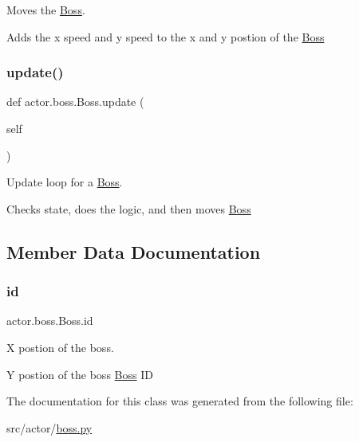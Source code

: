 Moves the \hyperlink{classactor_1_1boss_1_1_boss}{Boss}. 

Adds the x speed and y speed to the x and y postion of the \hyperlink{classactor_1_1boss_1_1_boss}{Boss} \mbox{\label{classactor_1_1boss_1_1_boss_a0caeabbf20958679e55952559a2b74ee}} 
\subsubsection{\texorpdfstring{update()}{update()}}
{\footnotesize\ttfamily def actor.\+boss.\+Boss.\+update (\begin{DoxyParamCaption}\item[{}]{self }\end{DoxyParamCaption})}



Update loop for a \hyperlink{classactor_1_1boss_1_1_boss}{Boss}. 

Checks state, does the logic, and then moves \hyperlink{classactor_1_1boss_1_1_boss}{Boss} 

\subsection{Member Data Documentation}
\mbox{\label{classactor_1_1boss_1_1_boss_a88b3aa7689b1d755e49e5dfbf7f30e86}} 
\subsubsection{\texorpdfstring{id}{id}}
{\footnotesize\ttfamily actor.\+boss.\+Boss.\+id}



X postion of the boss. 

Y postion of the boss \hyperlink{classactor_1_1boss_1_1_boss}{Boss} ID 

The documentation for this class was generated from the following file\+:\begin{DoxyCompactItemize}
\item 
src/actor/\hyperlink{boss_8py}{boss.\+py}\end{DoxyCompactItemize}
